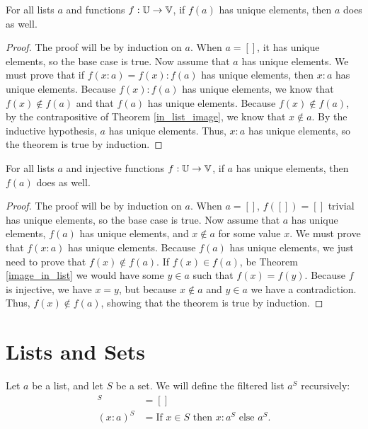 \documentclass[../math.tex]{subfiles}
\begin{document}
\begin{theorem} \label{list_image_unique}
    For all lists $a$ and functions $f : \mathbb{U} \to \mathbb{V}$, if $f(a)$ has unique
    elements, then $a$ does as well.
\end{theorem}
\begin{proof}
    The proof will be by induction on $a$.  When $a = []$, it has unique
    elements, so the base case is true.  Now assume that $a$ has unique
    elements.  We must prove that if $f(x : a) = f(x) : f(a)$ has unique
    elements, then $x : a$ has unique elements.  Because $f(x) : f(a)$ has
    unique elements, we know that $f(x) \notin f(a)$ and that $f(a)$ has unique
    elements.  Because $f(x) \notin f(a)$, by the contrapositive of Theorem
    \ref{in_list_image}, we know that $x \notin a$.  By the inductive
    hypothesis, $a$ has unique elements.  Thus, $x : a$ has unique elements, so
    the theorem is true by induction.
\end{proof}

\begin{theorem} \label{list_image_unique_inj}
    For all lists $a$ and injective functions $f : \mathbb{U} \to \mathbb{V}$, if $a$ has unique
    elements, then $f(a)$ does as well.
\end{theorem}
\begin{proof}
    The proof will be by induction on $a$.  When $a = []$, $f([]) = []$ trivial
    has unique elements, so the base case is true.  Now assume that $a$ has
    unique elements, $f(a)$ has unique elements, and $x \notin a$ for some value
    $x$.  We must prove that $f(x : a)$ has unique elements.  Because $f(a)$ has
    unique elements, we just need to prove that $f(x) \notin f(a)$.  If $f(x)
    \in f(a)$, be Theorem \ref{image_in_list} we would have some $y \in a$ such
    that $f(x) = f(y)$.  Because $f$ is injective, we have $x = y$, but because
    $x \notin a$ and $y \in a$ we have a contradiction.  Thus, $f(x) \notin
    f(a)$, showing that the theorem is true by induction.
\end{proof}

\section{Lists and Sets}

\begin{definition}
    Let $a$ be a list, and let $S$ be a set.  We will define the filtered list
    $a^S$ recursively:
    \begin{align*}
             []^S &= [] \\
        (x : a)^S &= \text{If $x \in S$ then $x : a^S$ else $a^S$}.
    \end{align*}
\end{definition}
\end{document}

